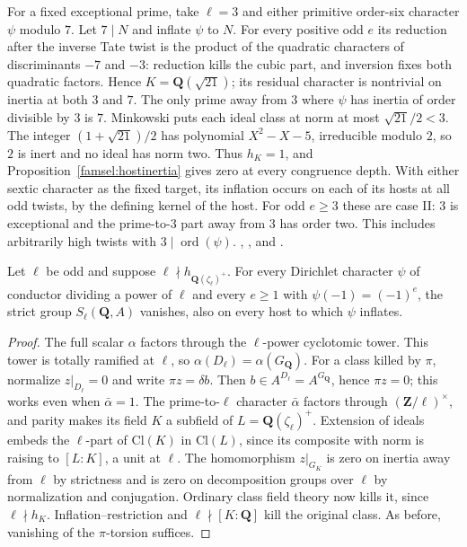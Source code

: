 For a fixed exceptional prime, take \(\ell=3\) and either primitive
order-six character \(\psi\) modulo \(7\). Let \(7\mid N\) and inflate
\(\psi\) to \(N\). For every positive odd \(e\) its reduction after
the inverse Tate twist is the product of the quadratic characters of
discriminants \(-7\) and \(-3\): reduction kills the cubic part,
and inversion fixes both quadratic factors. Hence
\(K=\mathbf Q(\sqrt{21})\); its residual character is nontrivial on
inertia at both \(3\) and \(7\). The only prime away from \(3\)
where \(\psi\) has inertia of order divisible by \(3\) is \(7\).
Minkowski puts each ideal class at norm at most \(\sqrt{21}/2<3\).
The integer \((1+\sqrt{21})/2\) has polynomial \(X^2-X-5\),
irreducible modulo \(2\), so \(2\) is inert and no ideal has norm
two. Thus \(h_K=1\), and Proposition~\ref{famsel:hostinertia} gives
zero at every congruence depth. With either sextic character as the
fixed target, its inflation occurs on each of its hosts at all odd
twists, by the defining kernel of the host. For odd \(e\ge3\) these
are case II: \(3\) is exceptional and the prime-to-\(3\) part away
from \(3\) has order two. This includes arbitrarily high twists with
\(3\mid\operatorname{ord}(\psi)\).
,
, and
.

\begin{proposition}\label{famsel:primary}
Let \(\ell\) be odd and suppose \(\ell\nmid h_{\mathbf Q(\zeta_\ell)^+}\).
For every Dirichlet character \(\psi\) of conductor dividing a power
of \(\ell\) and every \(e\ge1\) with \(\psi(-1)=(-1)^e\), the strict
group \(S_\ell(\mathbf Q,A)\) vanishes, also on every host to which
\(\psi\) inflates.
\end{proposition}
\begin{proof}
The full scalar \(\alpha\) factors through the \(\ell\)-power
cyclotomic tower. This tower is totally ramified at \(\ell\), so
\(\alpha(D_\ell)=\alpha(G_{\mathbf Q})\). For a class killed by
\(\pi\), normalize \(z|_{D_\ell}=0\) and write \(\pi z=\delta b\).
Then \(b\in A^{D_\ell}=A^{G_{\mathbf Q}}\), hence \(\pi z=0\);
this works even when \(\bar\alpha=1\).
The prime-to-\(\ell\) character \(\bar\alpha\) factors through
\((\mathbf Z/\ell)^\times\), and parity makes its field \(K\)
a subfield of \(L=\mathbf Q(\zeta_\ell)^+\).
Extension of ideals embeds the \(\ell\)-part of \(\mathrm{Cl}(K)\)
in \(\mathrm{Cl}(L)\), since its composite with norm is raising to
\([L:K]\), a unit at \(\ell\).
The homomorphism \(z|_{G_K}\) is zero on inertia away from \(\ell\)
by strictness and is zero on decomposition groups over \(\ell\)
by normalization and conjugation. Ordinary class field theory now
kills it, since \(\ell\nmid h_K\). Inflation--restriction and
\(\ell\nmid[K:\mathbf Q]\) kill the original class. As before,
vanishing of the \(\pi\)-torsion suffices.
\end{proof}


